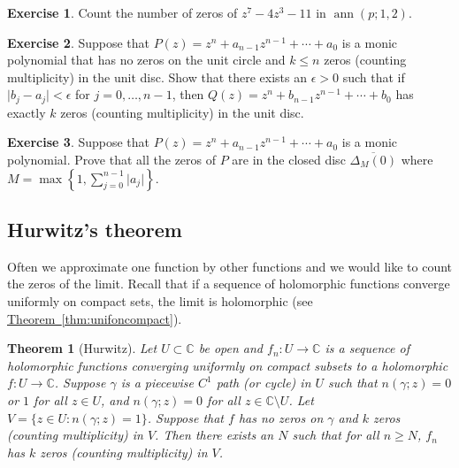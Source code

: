 \documentclass[12pt,openany]{book}
\newcommand{\ann}{\operatorname{ann}}
\newcommand{\sabs}[1]{\lvert {#1} \rvert}
\newcommand{\C}{{\mathbb{C}}}
\theoremstyle{plain}
\newtheorem{thm}{Theorem}[section]
\theoremstyle{remark}
\theoremstyle{definition}
\newenvironment{exbox}{%
    \def\FrameCommand{\vrule width 1pt \relax\hspace {10pt}}%
    \MakeFramed {\advance \hsize -\width \FrameRestore }%
}{%
    \endMakeFramed
}
\theoremstyle{exercise}
\newtheorem{exercise}{Exercise}[section]
\theoremstyle{example}
\newcommand{\thmref}[1]{\hyperref[#1]{Theorem~\ref*{#1}}}
\begin{document}
\begin{exbox}
\begin{exercise}
Count the number of zeros of $z^7-4z^3-11$ in $\ann(p;1,2)$.
\end{exercise}

\begin{exercise}
Suppose that
$P(z) = z^n + a_{n-1} z^{n-1} + \cdots + a_0$
is a monic polynomial that has no zeros on the unit circle and $k \leq n$ zeros
(counting multiplicity)
in the unit disc.  Show that there exists an $\epsilon > 0$ such that
if $\sabs{b_j-a_j} < \epsilon$ for $j=0,\ldots,n-1$, then
$Q(z) = z^n + b_{n-1} z^{n-1} + \cdots + b_0$ has
exactly $k$ zeros (counting multiplicity) in the unit disc.
\end{exercise}

\begin{exercise}
Suppose that
$P(z) = z^n + a_{n-1} z^{n-1} + \cdots + a_0$
is a monic polynomial.  Prove that all the zeros of $P$ are
in the closed disc $\overline{\Delta_M(0)}$ where $M =
\max\left\{ 1, \sum_{j=0}^{n-1} \sabs{a_j} \right\}$.
\end{exercise}
\end{exbox}

\subsection{Hurwitz's theorem}

Often we approximate one function by other functions and we would like to
count the zeros of the limit.  Recall that if a sequence of holomorphic
functions converge uniformly on compact sets, the limit is holomorphic
(see \thmref{thm:unifoncompact}).

\begin{thm}[Hurwitz]
Let $U \subset \C$ be open and $f_n \colon U \to \C$ is a sequence of
holomorphic functions converging uniformly on compact subsets
to a holomorphic $f \colon U \to \C$.  Suppose $\gamma$ is a piecewise $C^1$
path (or cycle) in $U$ such that $n(\gamma;z) = 0$ or $1$ for all $z \in U$,
and $n(\gamma;z) = 0$ for all $z \in \C \setminus U$.  Let
$V = \{ z \in U : n(\gamma;z) = 1 \}$.
Suppose that $f$ has no zeros on $\gamma$ and $k$ zeros (counting
multiplicity) in $V$.
Then there exists an $N$ such that for all $n \geq N$,
$f_n$ has $k$ zeros (counting multiplicity) in $V$.
\end{thm}
\end{document}
